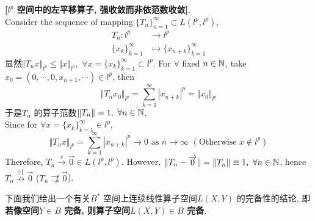 	\begin{example}\label{ex 4.3.1}
		\textbf{[$l^p$ 空间中的左平移算子, 强收敛而非依范数收敛]}. \\
		Consider the sequence of mapping $\{ T_n \}_{n = 1}^{\infty} \subset L(l^p , l^p)$, 
		\begin{align*}
			T_n : l^p &\longrightarrow l^p \\
			\{ x_k \}_{k = 1}^{\infty} &\longmapsto \{ x_{n + k} \}_{k = 1}^{\infty}
		\end{align*}
		显然$\Vert T_n x \Vert_{l^p} \leq \Vert x \Vert_{l^p} , \,\, \forall x = \{ x_k \}_{k = 1}^{\infty} \subset l^p$. For $\forall$ fixed $n \in \mathbb{N}$, take $x_0 = (0 , \cdots , 0 , x_{n + 1} , \cdots) \in l^p$, then
		\[ \Vert T_n x_0 \Vert_{l^p} = \sum_{k = 1}^{\infty} \left| x_{n + k} \right|^p = \Vert x_0 \Vert_{l^p} \]
		于是$T_n$ 的算子范数$\Vert T_n \Vert = 1 , \,\, \forall n \in \mathbb{N}$. \\
		Since for $\forall x = \{ x_k \}_{k = 1}^{\infty} \in l^p$, 
		\[ \Vert T_n x \Vert_{l^p} = \sum_{k = 1}^{\infty} \left| x_{n + k} \right|^p \to 0 \,\, \text{as} \,\, n \to \infty \,\, (\text{Otherwise $x \notin l^p$}) \]
		Therefore, $T_n \overset{s}{\to} \overrightarrow{0} \in L(l^p , l^p)$. However, $\Vert T_n - \overrightarrow{0} \Vert = \Vert T_n \Vert \equiv 1 , \,\, \forall n \in \mathbb{N}$, hence $T_n \overset{\Vert \cdot \Vert}{\not\to} \overrightarrow{0}$ ($T_n \not\rightrightarrows \overrightarrow{0}$).
	\end{example}
	
	\newpage
	
	下面我们给出一个有关$B^*$ 空间上连续线性算子空间$L(X , Y)$ 的完备性的结论, 即\textbf{若像空间$Y \in B$ 完备, 则算子空间$L(X , Y) \in B$ 完备}. 
	
	\vspace*{1em}
	
